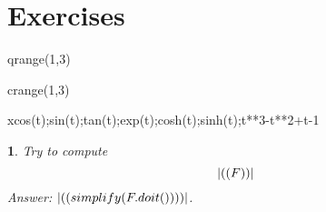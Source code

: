 \documentclass[a4paper,twoside,leqno]{article}
\newcounter{exer}
\numberwithin{exer}{subsection}
\theoremstyle{exer}
\newtheorem{exe}[exer]{}
\begin{document}
\section{Exercises}

\begin{symfor}{q}{range(1,3)}%
\begin{symfor}{c}{range(1,3)}%
\begin{symfor}{x}{cos(t);sin(t);tan(t);exp(t);cosh(t);sinh(t);t**3-t**2+t-1}%

\begin{exe}
Try to compute 
\[
\sym{F}
\]
Answer: $\sym{simplify(F.doit())}$. 
\end{exe}
\end{symfor}

\end{symfor}
\end{symfor}
\end{document}
